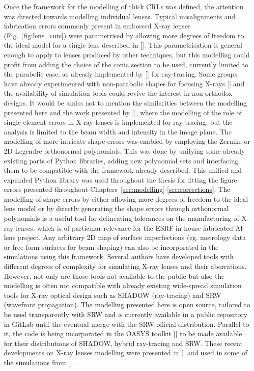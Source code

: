 \begin{refsection}
Once the framework for the modelling of thick CRLs was defined, the attention was directed towards modelling individual lenses. Typical misalignments and fabrication errors commonly present in embossed X-ray lenses (Fig.~\ref{fig:lens_cuts}) were parametrised by allowing more degrees of freedom to the ideal model for a single lens described in [\cite{Baltser2011}]. This parametrisation is general enough to apply to lenses produced by other techniques, but this modelling could profit from adding the choice of the conic section to be used, currently limited to the parabolic case, as already implemented by [\cite{SanchezdelRio2012,Andrejczuk2010}] for ray-tracing. Some groups have already experimented with non-parabolic shapes for focusing X-rays [\cite{Alianelli2007,Evans-Lutterodt2003, Alianelli2015, Sutter2017}] and the availability of simulation tools could revive the interest in non-orthodox designs. It would be amiss not to mention the similarities between the modelling presented here and the work presented by [\cite{Andrejczuk2010}], where the modelling of the role of single element errors in X-ray lenses is implemented for ray-tracing, but the analysis is limited to the beam width and intensity in the image plane. The modelling of more intricate shape errors was enabled by employing the Zernike or 2D Legendre orthonormal polynomials. This was done by unifying some already existing parts of Python libraries, adding new polynomial sets and interfacing them to be compatible with the framework already described. This unified and expanded Python library was used throughout the thesis for fitting the figure errors presented throughout Chapters~\ref{sec:modelling}-\ref{sec:corrections}. The modelling of shape errors by either allowing more degrees of freedom to the ideal lens model or by directly generating the shape errors through orthonormal polynomials is a useful tool for delineating tolerances on the manufacturing of X-ray lenses, which is of particular relevance for the ESRF in-house fabricated Al-lens project. Any arbitrary 2D map of surface imperfections (eg. metrology data or free-form surfaces for beam shaping) can also be incorporated in the simulations using this framework. Several authors have developed tools with different degrees of complexity for simulating X-ray lenses and their aberrations. However, not only are those tools not available to the public but also the modelling is often not compatible with already existing wide-spread simulation tools for X-ray optical design such as SHADOW (ray-tracing) and SRW (wavefront propagation). The modelling presented here is open source, tailored to be used transparently with SRW and is currently available in a public repository in GitLab until the eventual merge with the SRW official distribution. Parallel to it, the code is being incorporated in the OASYS toolkit [\cite{Rebuffi2017}] to be made available for their distributions of SHADOW, hybrid ray-tracing and SRW. These recent developments on X-ray lenses modelling were presented in [\cite{Celestre2020b}] and used in some of the simulations from [\cite{Chubar2020}].


\end{refsection}
